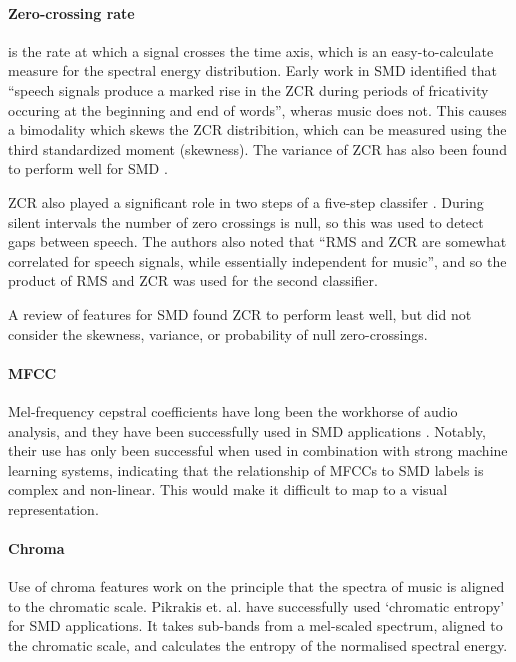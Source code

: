 \paragraph{Zero-crossing rate} is the rate at which a signal crosses the time axis, which is an easy-to-calculate
measure for the spectral energy distribution. Early work in SMD \citep{Saunders1996} identified that ``speech signals
produce a marked rise in the ZCR during periods of fricativity occuring at the beginning and end of words'', wheras
music does not. This causes a bimodality which skews the ZCR distribition, which can be measured using the third
standardized moment (skewness). The variance of ZCR has also been found to perform well for SMD \citep{Scheirer1997}.

ZCR also played a significant role in two steps of a five-step classifer \citep{Panagiotakis2005}. During silent
intervals the number of zero crossings is null, so this was used to detect gaps between speech. The authors also noted
that ``RMS and ZCR are somewhat correlated for speech signals, while essentially independent for music'', and so the
product of RMS and ZCR was used for the second classifier.

A review \citep{Carey1999} of features for SMD found ZCR to perform least well, but did not consider the skewness,
variance, or probability of null zero-crossings.

\paragraph{MFCC}
Mel-frequency cepstral coefficients have long been the workhorse of audio analysis, and they have been successfully
used in SMD applications \citep{Carey1999,Liang2005,Pikrakis2008,Pikrakis2006a,Sell2014,Wieser2014}.  Notably, their
use has only been successful when used in combination with strong machine learning systems, indicating that the
relationship of MFCCs to SMD labels is complex and non-linear. This would make it difficult to map to a visual
representation.

\paragraph{Chroma}
Use of chroma features work on the principle that the spectra of music is aligned to the chromatic scale. Pikrakis et.
al.  \citep{Pikrakis2006,Pikrakis2008} have successfully used `chromatic entropy' for SMD applications. It takes
sub-bands from a mel-scaled spectrum, aligned to the chromatic scale, and calculates the entropy of the normalised
spectral energy.

